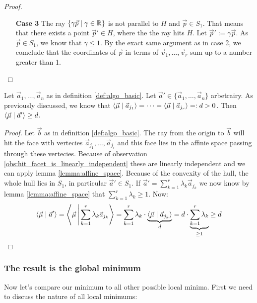 \begin{proof}
\begin{itemize}
        \item[\textbf{Case 3}] The ray $\{\gamma\vec p\mid \gamma \in \mathbb{R}\}$ is not parallel to $H$ and $\vec p \in S_1$. That means that there exists a point $\vec p' \in H$, where the the ray hits $H$. Let $\vec p' := \gamma \vec p$. As $\vec p \in S_1$, we know that $\gamma \leq 1$. By the exact same argument as in case 2, we comclude that the coordinates of $\vec p$ in terms of $\vec v_1, \dots, \vec v_r$ sum up to a number greater than 1.
    \end{itemize}
\end{proof}

\begin{lemma}
    Let $\vec a_1, \dots, \vec a_n$ as in definition \ref{def:algo_basic}. Let $\vec a' \in \{\vec a_1, \dots, \vec a_n\}$ arbetrairy. As previously discussed, we know that $\langle \vec\mu \mid \vec a_{j_1} \rangle = \dots = \langle \vec\mu \mid \vec a_{j_r} \rangle =: d > 0$. Then $\langle \vec\mu \mid \vec a' \rangle \geq d$.
\end{lemma}
\begin{proof}
    Let $\vec b$ as in definition \ref{def:algo_basic}. The ray from the origin to $\vec b$ will hit the face with vertecies $\vec a_{j_1}, \dots, \vec a_{j_r}$ and this face lies in the affinie space passing through these vertecies. Because of observation \ref{obs:hit_facet_is_linearly_independent} these are linearly independent and we can apply lemma \ref{lemma:affine_space}. Because of the convexity of the hull, the whole hull lies in $S_1$, in particular $\vec a' \in S_1$. If $\vec a' = \sum_{k=1}^r \lambda_k \vec a_{j_k}$ we now know by lemma \ref{lemma:affine_space} that $\sum_{k=1}^r \lambda_k \geq 1$. Now:
    $$\langle \vec\mu \mid \vec a' \rangle = \left\langle \vec\mu \,\middle|\, \sum_{k=1}^r \lambda_k \vec a_{j_k} \right\rangle = \sum_{k=1}^r\lambda_k \cdot \underbrace{\langle \vec\mu \mid \vec a_{j_k} \rangle}_d = d\cdot \underbrace{\sum_{k=1}^r\lambda_k}_{\geq 1} \geq d$$
\end{proof}

\subsubsection{The result is the global minimum}
Now let's compare our minimum to all other possible local minima. First we need to discuss the nature of all local minimums:

